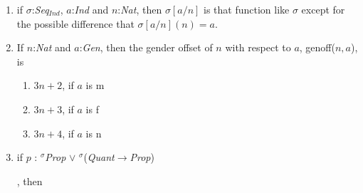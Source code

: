 \begin{enumerate}
\item if $\sigma$:\textit{Seq}$_{\mathit{Ind}}$, $a$:\textit{Ind} and $n$:\textit{Nat},
  then $\sigma[a/n]$ is that function like $\sigma$ except for the
  possible difference that $\sigma[a/n](n)=a$.

\item If $n$:\textit{Nat} and $a$:\textit{Gen}, then the gender offset
  of $n$ with respect to $a$, genoff($n,a$), is
\begin{enumerate} 
 
\item $3n+2$, if $a$ is m 
 
\item $3n+3$, if $a$ is f

\item $3n+4$, if $a$ is n
 
\end{enumerate} 
  

\item if $p$ : $^\sigma$\textit{Prop} $\vee$
   $^\sigma$(\textit{Quant}$\rightarrow$\textit{Prop}), then
\begin{enumerate} 
 

\end{enumerate}
\end{enumerate}
